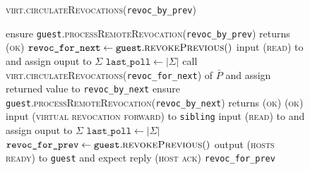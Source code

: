 \begin{figure}[H]
  \begin{processbox}{\textsc{virt.circulateRevocations}(\texttt{revoc\_by\_prev})}
    \begin{algorithmic}[1]
     
      \State ensure
      \texttt{guest}.\textsc{processRemoteRevocation}(\texttt{revoc\_by\_prev})
      returns (\textsc{ok})
    \Else \: 
      \State $\texttt{revoc\_for\_next} \gets
      \texttt{guest}.\textsc{revokePrevious}()$
      \State input (\textsc{read}) to \ledger and assign ouput to $\Sigma$
      \State $\texttt{last\_poll} \gets |\Sigma|$
      \State call \textsc{virt.circulateRevocations}(\texttt{revoc\_for\_next})
      of $\bar{P}$ and assign returned value to \texttt{revoc\_by\_next}
      \State ensure
      \texttt{guest}.\textsc{processRemoteRevocation}(\texttt{revoc\_by\_next})
      returns (\textsc{ok}) 
      \State \Return (\textsc{ok})
    \EndIf
     
      \State input (\textsc{virtual revocation forward}) to \texttt{sibling}
      \State {}
      \State input (\textsc{read}) to \ledger and assign ouput to $\Sigma$
      \State $\texttt{last\_poll} \gets |\Sigma|$
      \State {}
      \State {}
      \State {}
    \EndIf
    \State $\texttt{revoc\_for\_prev} \gets
    \texttt{guest}.\textsc{revokePrevious}()$
    \State output (\textsc{hosts ready}) to \texttt{guest} and expect reply
    (\textsc{host ack})
    \State \Return \texttt{revoc\_for\_prev} 
    \end{algorithmic}
  \end{processbox}
  \caption{}
  \label{code:virtual-layer:revocation}
\end{figure}

